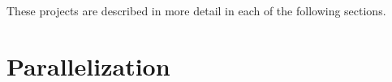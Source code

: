 \myend

These projects are described in more detail in each of the following
sections.

\section{Parallelization}






